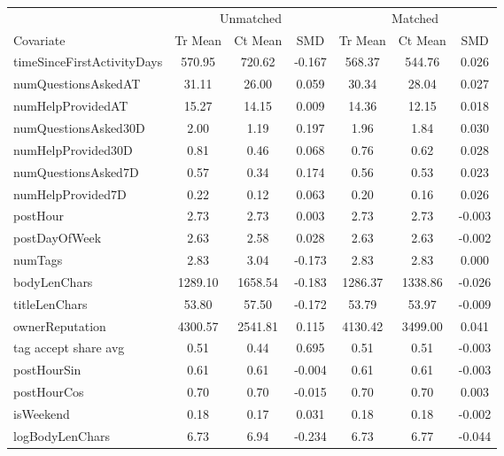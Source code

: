\begin{table}[htbp]\centering\small
\begin{tabular}{lcccccc}\toprule
 & \multicolumn{3}{c}{Unmatched} & \multicolumn{3}{c}{Matched} \\ \cmidrule(lr){2-4} \cmidrule(lr){5-7}
 Covariate & Tr Mean & Ct Mean & SMD & Tr Mean & Ct Mean & SMD \\\midrule
 timeSinceFirstActivityDays & 570.95 & 720.62 & -0.167 & 568.37 & 544.76 & 0.026 \\
 numQuestionsAskedAT & 31.11 & 26.00 & 0.059 & 30.34 & 28.04 & 0.027 \\
 numHelpProvidedAT & 15.27 & 14.15 & 0.009 & 14.36 & 12.15 & 0.018 \\
 numQuestionsAsked30D & 2.00 & 1.19 & 0.197 & 1.96 & 1.84 & 0.030 \\
 numHelpProvided30D & 0.81 & 0.46 & 0.068 & 0.76 & 0.62 & 0.028 \\
 numQuestionsAsked7D & 0.57 & 0.34 & 0.174 & 0.56 & 0.53 & 0.023 \\
 numHelpProvided7D & 0.22 & 0.12 & 0.063 & 0.20 & 0.16 & 0.026 \\
 postHour & 2.73 & 2.73 & 0.003 & 2.73 & 2.73 & -0.003 \\
 postDayOfWeek & 2.63 & 2.58 & 0.028 & 2.63 & 2.63 & -0.002 \\
 numTags & 2.83 & 3.04 & -0.173 & 2.83 & 2.83 & 0.000 \\
 bodyLenChars & 1289.10 & 1658.54 & -0.183 & 1286.37 & 1338.86 & -0.026 \\
 titleLenChars & 53.80 & 57.50 & -0.172 & 53.79 & 53.97 & -0.009 \\
 ownerReputation & 4300.57 & 2541.81 & 0.115 & 4130.42 & 3499.00 & 0.041 \\
 tag accept share avg & 0.51 & 0.44 & 0.695 & 0.51 & 0.51 & -0.003 \\
 postHourSin & 0.61 & 0.61 & -0.004 & 0.61 & 0.61 & -0.003 \\
 postHourCos & 0.70 & 0.70 & -0.015 & 0.70 & 0.70 & 0.003 \\
 isWeekend & 0.18 & 0.17 & 0.031 & 0.18 & 0.18 & -0.002 \\
 logBodyLenChars & 6.73 & 6.94 & -0.234 & 6.73 & 6.77 & -0.044 \\
\bottomrule\end{tabular}\end{table}
